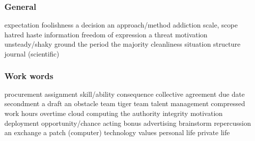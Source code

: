 \subsubsection*{General}
   {expectation}
   {foolishness}
   {a decision}
   {an approach/method}
   {addiction}
   {scale, scope}
   {hatred}
   {haste}
   {information}
   {freedom of expression}
   {a threat}
   {motivation}
   {unsteady/shaky ground}
   {the period}
   {the majority}
   {cleanliness}
   {situation}
   {structure}
   {journal (scientific)}
\subsubsection*{Work words}
   {procurement}
   {assignment}
   {skill/ability}
   {consequence}
   {collective agreement}
   {due date}
   {secondment}
   {a draft}
   {an obstacle}
   {team}
   {tiger team}
   {talent management}
   {compressed work hours}
   {overtime}
   {cloud computing}
   {the authority}
   {integrity}
   {motivation}
   {deployment}
   {opportunity/chance}
   {acting}
   {bonus}
   {advertising}
   {brainstorm}
   {repercussion}
   {an exchange}
   {a patch (computer)}
   {technology}
   {values}
   {personal life}
   {private life}
